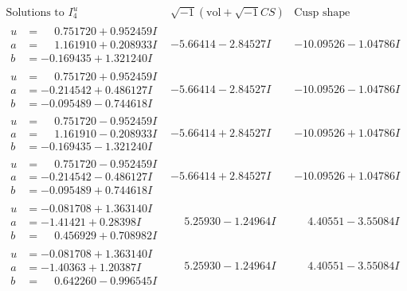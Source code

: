 \documentclass[1p]{elsarticle_modified}
\theoremstyle{definition}
\newcommand{\I}{\sqrt{-1}}
\begin{document}
$$\begin{array}{c|c|c}  
\text{Solutions to }I^u_{4}& \I (\text{vol} + \sqrt{-1}CS) & \text{Cusp shape}\\
 \hline 
\begin{aligned}
u &= \phantom{-}0.751720 + 0.952459 I \\
a &= \phantom{-}1.161910 + 0.208933 I \\
b &= -0.169435 + 1.321240 I\end{aligned}
 & -5.66414 - 2.84527 I & -10.09526 - 1.04786 I \\ \hline\begin{aligned}
u &= \phantom{-}0.751720 + 0.952459 I \\
a &= -0.214542 + 0.486127 I \\
b &= -0.095489 - 0.744618 I\end{aligned}
 & -5.66414 - 2.84527 I & -10.09526 - 1.04786 I \\ \hline\begin{aligned}
u &= \phantom{-}0.751720 - 0.952459 I \\
a &= \phantom{-}1.161910 - 0.208933 I \\
b &= -0.169435 - 1.321240 I\end{aligned}
 & -5.66414 + 2.84527 I & -10.09526 + 1.04786 I \\ \hline\begin{aligned}
u &= \phantom{-}0.751720 - 0.952459 I \\
a &= -0.214542 - 0.486127 I \\
b &= -0.095489 + 0.744618 I\end{aligned}
 & -5.66414 + 2.84527 I & -10.09526 + 1.04786 I \\ \hline\begin{aligned}
u &= -0.081708 + 1.363140 I \\
a &= -1.41421 + 0.28398 I \\
b &= \phantom{-}0.456929 + 0.708982 I\end{aligned}
 & \phantom{-}5.25930 - 1.24964 I & \phantom{-}4.40551 - 3.55084 I \\ \hline\begin{aligned}
u &= -0.081708 + 1.363140 I \\
a &= -1.40363 + 1.20387 I \\
b &= \phantom{-}0.642260 - 0.996545 I\end{aligned}
 & \phantom{-}5.25930 - 1.24964 I & \phantom{-}4.40551 - 3.55084 I \\ \hline\begin{aligned}

\end{aligned}
\end{array}$$
\end{document}

